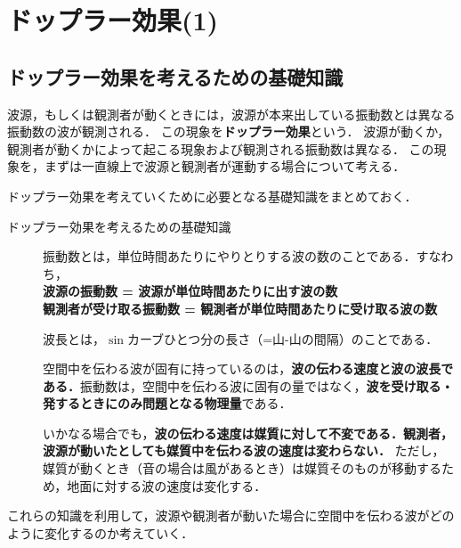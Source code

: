 \section{ドップラー効果(1)}

\subsection{ドップラー効果を考えるための基礎知識}
波源，もしくは観測者が動くときには，波源が本来出している振動数とは異なる振動数の波が観測される．
この現象を{\bf ドップラー効果}という．
波源が動くか，観測者が動くかによって起こる現象および観測される振動数は異なる．
この現象を，まずは一直線上で波源と観測者が運動する場合について考える．

ドップラー効果を考えていくために必要となる基礎知識をまとめておく．

\begin{matome}{ドップラー効果を考えるための基礎知識}
 \begin{description}
\item[] 振動数とは，単位時間あたりにやりとりする波の数のことである．すなわち，\\
\hspace{3mm}  {\bf 波源の振動数\hspace{18mm} =\hspace{2mm} 波源が単位時間あたりに出す波の数}\\
\hspace{3mm}  {\bf 観測者が受け取る振動数\hspace{2mm} =\hspace{2mm} 観測者が単位時間あたりに受け取る波の数}
\item[] 波長とは，$\sin$カーブひとつ分の長さ（=山-山の間隔）のことである．
\item[] 空間中を伝わる波が固有に持っているのは，{\bf 波の伝わる速度と波の波長である．}振動数は，空間中を伝わる波に固有の量ではなく，{\bf 波を受け取る・発するときにのみ問題となる物理量}である．
\item[] いかなる場合でも，{\bf 波の伝わる速度は媒質に対して不変である．観測者，波源が動いたとしても媒質中を伝わる波の速度は変わらない．}
  ただし，媒質が動くとき（音の場合は風があるとき）は媒質そのものが移動するため，地面に対する波の速度は変化する．  
\end{description}
 \end{matome}
 
これらの知識を利用して，波源や観測者が動いた場合に空間中を伝わる波がどのように変化するのか考えていく．
 
